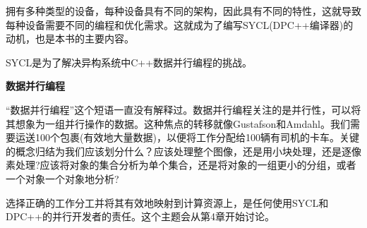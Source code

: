 拥有多种类型的设备，每种设备具有不同的架构，因此具有不同的特性，这就导致每种设备需要不同的编程和优化需求。这就成为了编写SYCL(DPC++编译器)的动机，也是本书的主要内容。\par

\begin{tcolorbox}[colback=red!5!white,colframe=red!75!black]
SYCL是为了解决异构系统中C++数据并行编程的挑战。
\end{tcolorbox}

\hspace*{\fill} \par %
\textbf{数据并行编程}

“数据并行编程”这个短语一直没有解释过。数据并行编程关注的是并行性，可以将其想象为一组并行操作的数据。这种焦点的转移就像Gustafson和Amdahl。我们需要运送100个包裹(有效地大量数据)，以便将工作分配给100辆有司机的卡车。关键的概念归结为我们应该划分什么？应该处理整个图像，还是用小块处理，还是逐像素处理?应该将对象的集合分析为单个集合，还是将对象的一组更小的分组，或者一个对象一个对象地分析?\par

选择正确的工作分工并将其有效地映射到计算资源上，是任何使用SYCL和DPC++的并行开发者的责任。这个主题会从第4章开始讨论。\par












